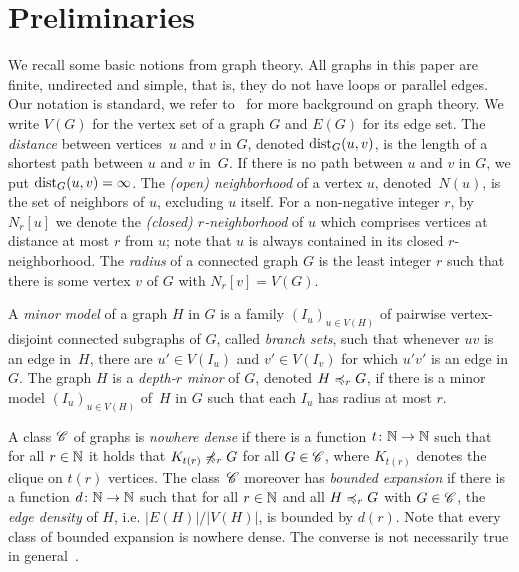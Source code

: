 \section{Preliminaries}\label{sec:prelim}
We recall some basic notions from graph theory.
All graphs in this paper are finite, undirected and simple,
that is, they do not have loops or parallel edges. Our notation is
standard, we refer to~\cite{diestel2012graph} for more background on
graph theory.  We write $V(G)$ for the vertex set of a graph $G$ and
$E(G)$ for its edge set.  The {\em{distance}} between vertices~$u$ and
$v$ in $G$, denoted $\mathrm{dist}_G(u,v)$, is the length of a shortest path
between $u$ and $v$ in~$G$.  If there is no path between $u$ and $v$
in $G$, we put $\mathrm{dist}_G(u,v)=\infty$.  The {\em{(open) neighborhood}}
of a vertex $u$, denoted~$N(u)$, is the set of neighbors of $u$,
excluding $u$ itself.  For a non-negative integer $r$, by $N_r[u]$ we
denote the {\em{(closed) $r$-neighborhood}} of $u$ which comprises
vertices at distance at most $r$ from $u$; note that $u$ is always
contained in its closed $r$-neighborhood. The \emph{radius} of a
connected graph $G$ is the least integer $r$ such that there is some
vertex $v$ of $G$ with $N_r[v]=V(G)$.


A {\em{minor model}} of a graph $H$ in $G$ is a family
$(I_u)_{u\in V(H)}$ of pairwise vertex-disjoint connected subgraphs of
$G$, called {\em{branch sets}}, such that whenever $uv$ is an edge
in~$H$, there are $u'\in V(I_u)$ and $v'\in V(I_v)$ for which $u'v'$
is an edge in $G$.  The graph $H$ is a {\em{depth-$r$ minor}} of $G$,
denoted $H\preccurlyeq_rG$, if there is a minor model $(I_u)_{u\in V(H)}$
of~$H$ in $G$ such that each $I_u$ has radius at most $r$.

A class $\mathscr{C}$ of graphs is \emph{nowhere dense} if there is a
function $t\colon \mathbb{N}\rightarrow \mathbb{N}$ such that for all $r\in \mathbb{N}$ it
holds that $K_{t(r)}\not\preccurlyeq_r G$ for all $G\in \mathscr{C}$, where
$K_{t(r)}$ denotes the clique on $t(r)$ vertices.  The class~$\mathscr{C}$
moreover has \emph{bounded expansion} if there is a function
$d\colon\mathbb{N}\rightarrow\mathbb{N}$ such that for all $r\in \mathbb{N}$ and all
$H\preccurlyeq_rG$ with $G\in\mathscr{C}$, the {\em{edge density}} of $H$,
i.e. $|E(H)|/|V(H)|$, is bounded by $d(r)$. Note that every class of
bounded expansion is nowhere dense. The converse is not necessarily
true in general~\cite{sparsity}.


 

